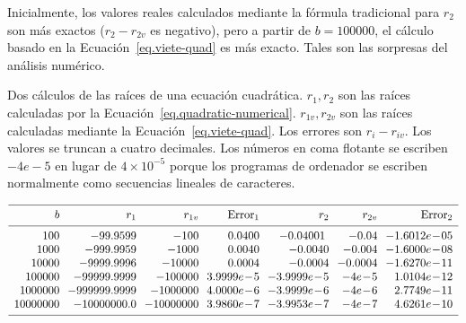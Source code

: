 Inicialmente, los valores reales calculados mediante la fórmula tradicional para $r_2$ son más exactos ($r_2-r_{2v}$ es negativo), pero a partir de $b=100000$, el cálculo basado en la Ecuación~\ref{eq.viete-quad} es más exacto. Tales son las sorpresas del análisis numérico.

\begin{table}[bht]
\caption[Dos cálculos de las raíces de una ecuación cuadrática]{Dos cálculos de las raíces de una ecuación cuadrática. $r_1,r_2$ son las raíces calculadas por la Ecuación~\ref{eq.quadratic-numerical}. $r_{1v},r_{2v}$ son las raíces calculadas mediante la Ecuación~\ref{eq.viete-quad}. Los errores son $r_{i}-r_{iv}$. Los valores se truncan a cuatro decimales.
Los números en coma flotante se escriben $-4e-5$ en lugar de $4\times 10^{-5}$ porque los programas de ordenador se escriben normalmente como secuencias lineales de caracteres.} \label{t.quadratic}

\begin{scriptsize}
\[
\begin{array}{r@{\hspace{2.5mm}}r@{\hspace{2.5mm}}r@{\hspace{2.5mm}}r@{\hspace{2.5mm}}r@{\hspace{2.5mm}}r@{\hspace{2.5mm}}r}
\hline
\noalign{\smallskip}
b & r_1 & r_{1v} & \mathrm{Error}_1 & r_2 & r_{2v} & \mathrm{Error}_2\\
\noalign{\smallskip}\hline\noalign{\smallskip}
100  &  -99.9599  &  -100  &  0.0400  &  -0.04001\  &  -0.04  &  -1.6012e\!-\!05\\
1000  &  -999.9959  &  -1000  &  0.0040  &  -0.0040  &  -0.004  &  -1.6000e\!-\!08\\
10000  &  -9999.9996  &  -10000  &  0.0004  &  -0.0004  &  -0.0004  &  -1.6270e\!-\!11\\
100000  &  -99999.9999  &  -100000  &  3.9999e\!-\!5  &  -3.9999e\!-\!5  &  -4e\!-\!5  &  1.0104e\!-\!12\\
1000000  &  -999999.9999  &  -1000000  &  4.0000e\!-\!6  &  -3.9999e\!-\!6  &  -4e\!-\!6  &  2.7749e\!-\!11\\
10000000  &  -10000000.0  &  -10000000  &  3.9860e\!-\!7  &  -3.9953e\!-\!7  &  -4e\!-\!7  &  4.6261e\!-\!10\\
 \noalign{\smallskip}
 \hline
\end{array}
\]
\end{scriptsize}
\end{table}

